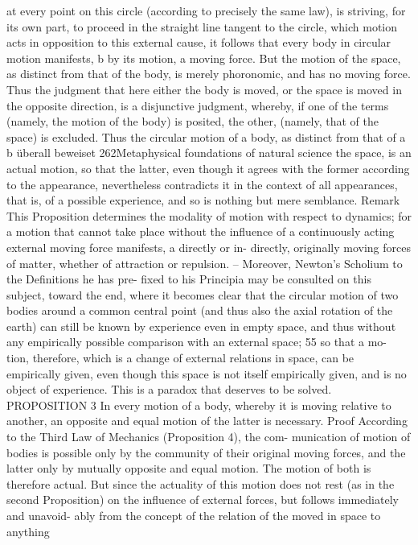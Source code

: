 at every point on this circle (according to precisely the same law), is
striving, for its own part, to proceed in the straight line tangent to the
circle, which motion acts in opposition to this external cause, it follows
that every body in circular motion manifests, b by its motion, a moving
force. But the motion of the space, as distinct from that of the body, is
merely phoronomic, and has no moving force. Thus the judgment that
here either the body is moved, or the space is moved in the opposite
direction, is a disjunctive judgment, whereby, if one of the terms (namely,
the motion of the body) is posited, the other, (namely, that of the space)
is excluded. Thus the circular motion of a body, as distinct from that of
a
b
überall
beweiset
262Metaphysical foundations of natural science
the space, is an actual motion, so that the latter, even though it agrees
with the former according to the appearance, nevertheless contradicts it
in the context of all appearances, that is, of a possible experience, and so
is nothing but mere semblance.
Remark
This Proposition determines the modality of motion with respect to
dynamics; for a motion that cannot take place without the inﬂuence of
a continuously acting external moving force manifests, a directly or in-
directly, originally moving forces of matter, whether of attraction or
repulsion. – Moreover, Newton’s Scholium to the Deﬁnitions he has pre-
ﬁxed to his Principia may be consulted on this subject, toward the end,
where it becomes clear that the circular motion of two bodies around a
common central point (and thus also the axial rotation of the earth) can
still be known by experience even in empty space, and thus without any
empirically possible comparison with an external space; 55 so that a mo-
tion, therefore, which is a change of external relations in space, can be
empirically given, even though this space is not itself empirically given,
and is no object of experience. This is a paradox that deserves to be
solved.
PROPOSITION 3
In every motion of a body, whereby it is moving relative to another, an
opposite and equal motion of the latter is necessary.
Proof
According to the Third Law of Mechanics (Proposition 4), the com-
munication of motion of bodies is possible only by the community of
their original moving forces, and the latter only by mutually opposite
and equal motion. The motion of both is therefore actual. But since the
actuality of this motion does not rest (as in the second Proposition) on
the inﬂuence of external forces, but follows immediately and unavoid-
ably from the concept of the relation of the moved in space to anything
